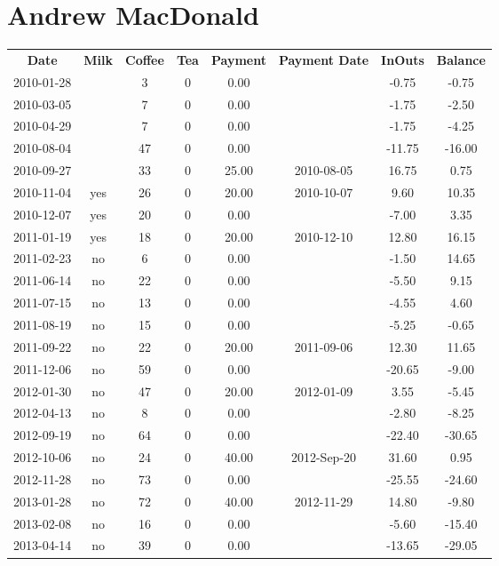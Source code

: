 \section{Andrew MacDonald}

\begin{center}
\begin{tabular}{cccccccc}
\textbf{Date} & \textbf{Milk} & \textbf{Coffee} & \textbf{Tea} & \textbf{Payment} & \textbf{Payment Date} & \textbf{InOuts} & \textbf{Balance} \\
2010-01-28 &  &  3 & 0 &  0.00 &  &  -0.75 &  -0.75\\ 
2010-03-05 &  &  7 & 0 &  0.00 &  &  -1.75 &  -2.50\\ 
2010-04-29 &  &  7 & 0 &  0.00 &  &  -1.75 &  -4.25\\ 
2010-08-04 &  & 47 & 0 &  0.00 &  & -11.75 & -16.00\\ 
2010-09-27 &  & 33 & 0 & 25.00 & 2010-08-05 &  16.75 &   0.75\\ 
2010-11-04 & yes & 26 & 0 & 20.00 & 2010-10-07 &   9.60 &  10.35\\ 
2010-12-07 & yes & 20 & 0 &  0.00 &  &  -7.00 &   3.35\\ 
2011-01-19 & yes & 18 & 0 & 20.00 & 2010-12-10 &  12.80 &  16.15\\ 
2011-02-23 & no &  6 & 0 &  0.00 &  &  -1.50 &  14.65\\ 
2011-06-14 & no & 22 & 0 &  0.00 &  &  -5.50 &   9.15\\ 
2011-07-15 & no & 13 & 0 &  0.00 &  &  -4.55 &   4.60\\ 
2011-08-19 & no & 15 & 0 &  0.00 &  &  -5.25 &  -0.65\\ 
2011-09-22 & no & 22 & 0 & 20.00 & 2011-09-06 &  12.30 &  11.65\\ 
2011-12-06 & no & 59 & 0 &  0.00 &  & -20.65 &  -9.00\\ 
2012-01-30 & no & 47 & 0 & 20.00 & 2012-01-09 &   3.55 &  -5.45\\ 
2012-04-13 & no &  8 & 0 &  0.00 &  &  -2.80 &  -8.25\\ 
2012-09-19 & no & 64 & 0 &  0.00 &  & -22.40 & -30.65\\ 
2012-10-06 & no & 24 & 0 & 40.00 & 2012-Sep-20 &  31.60 &   0.95\\ 
2012-11-28 & no & 73 & 0 &  0.00 &  & -25.55 & -24.60\\ 
2013-01-28 & no & 72 & 0 & 40.00 & 2012-11-29 &  14.80 &  -9.80\\ 
2013-02-08 & no & 16 & 0 &  0.00 &  &  -5.60 & -15.40\\ 
2013-04-14 & no & 39 & 0 &  0.00 &  & -13.65 & -29.05
\end{tabular}
\end{center}

